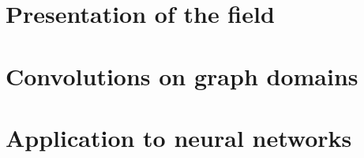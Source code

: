\documentclass[12pt]{book}
\begin{document}

%
%


%
%

\dominitoc
\tableofcontents




  \chapter{Presentation of the field}
  \vfill\minitoc\newpage
  \newpage

  \newpage
  \newpage
  \newpage

%
%

\setcounter{chapter}{1}
\chapter{Convolutions on graph domains}
\newpage
\vfill\minitoc\newpage

\newpage
\newpage
\newpage
\newpage
\newpage

%
%
 \setcounter{chapter}{2}
 \chapter{Application to neural networks}
 \vfill\minitoc\newpage
 \newpage


 \newpage
 \newpage

%
%
\end{document}
